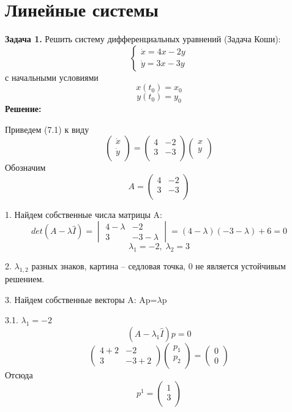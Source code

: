 \documentclass[10pt]{report}
\begin{document}
\section {Линейные системы}
\textbf{Задача 1.} Решить систему дифференциальных уравнений (Задача Коши): 
\begin{equation}
\left\{
\begin{array}{lr}
\dot{x} = 4x-2y\\
\dot{y} = 3x-3y
\end{array}
\right.
\end{equation}
с начальными условиями
\[ x(t_0)=x_0\]
\[y(t_0)=y_0\]
\textbf{Решение:} \par

Приведем (7.1) к виду
\begin{equation}
\left(
\begin{array}{c}
\dot{x}\\
\dot{y}\\
\end{array}
\right)
 = \left(
\begin{array}{cc}
4 & -2\\
3 & -3\\
\end{array}
\right)
\left(
\begin{array}{cc}
x\\
y\\
\end{array}
\right)
\end{equation}
Обозначим 
\[
A = \left(
\begin{array}{cc}
4 & -2\\
3 & -3\\
\end{array}
\right)\]

1. Найдем собственные числа матрицы A:
\[det(A-\lambda \hat{I})=
\begin{vmatrix}
4-\lambda & -2 \\
3 & -3-\lambda
\end{vmatrix}
=(4-\lambda)(-3-\lambda)+6=0\]
\[\lambda_1=-2, \; \lambda_2=3\]

2.  $\lambda_{1,2}$ разных знаков, картина -- седловая точка, 0 не является устойчивым решением.

3. Найдем собственные векторы A: Ap=$\lambda$p

3.1. $\lambda_1=-2$\\
\[(A-\lambda_1 \hat{I})p=0\]
\[\left(
\begin{array}{cc}
4+2 & -2\\
3 & -3+2
\end{array}
\right)
\left(
\begin{array}{cc}
p_1\\
p_2\\
\end{array}
\right)=
\left(
\begin{array}{c}
0\\
0
\end{array}
\right)
\]
Отсюда
\[p^1=
\left(
\begin{array}{cc}
1\\
3\\
\end{array}
\right)
\]
\end{document}
